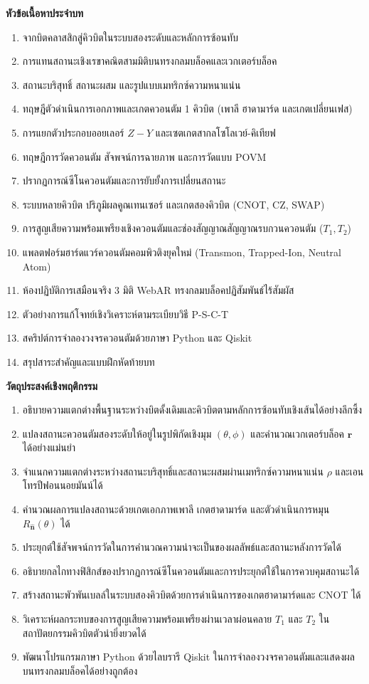 \begin{lessonplanbox}
\noindent\textbf{หัวข้อเนื้อหาประจำบท}
\begin{enumerate}
    \item จากบิตคลาสสิกสู่คิวบิตในระบบสองระดับและหลักการซ้อนทับ
    \item การแทนสถานะเชิงเรขาคณิตสามมิติบนทรงกลมบล็อคและเวกเตอร์บล็อค
    \item สถานะบริสุทธิ์ สถานะผสม และรูปแบบเมทริกซ์ความหนาแน่น
    \item ทฤษฎีตัวดำเนินการเอกภาพและเกตควอนตัม 1 คิวบิต (เพาลี ฮาดามาร์ด และเกตเปลี่ยนเฟส)
    \item การแยกตัวประกอบออยเลอร์ $Z-Y$ และเซตเกตสากลโซโลเวย์-คิเทียฟ
    \item ทฤษฎีการวัดควอนตัม สัจพจน์การฉายภาพ และการวัดแบบ POVM
    \item ปรากฏการณ์ซีโนควอนตัมและการยับยั้งการเปลี่ยนสถานะ
    \item ระบบหลายคิวบิต ปริภูมิผลคูณเทนเซอร์ และเกตสองคิวบิต (CNOT, CZ, SWAP)
    \item การสูญเสียความพร้อมเพรียงเชิงควอนตัมและช่องสัญญาณสัญญาณรบกวนควอนตัม ($T_1, T_2$)
    \item แพลตฟอร์มฮาร์ดแวร์ควอนตัมคอมพิวติงยุคใหม่ (Transmon, Trapped-Ion, Neutral Atom)
    \item ห้องปฏิบัติการเสมือนจริง 3 มิติ WebAR ทรงกลมบล็อคปฏิสัมพันธ์ไร้สัมผัส
    \item ตัวอย่างการแก้โจทย์เชิงวิเคราะห์ตามระเบียบวิธี P-S-C-T
    \item สคริปต์การจำลองวงจรควอนตัมด้วยภาษา Python และ Qiskit
    \item สรุปสาระสำคัญและแบบฝึกหัดท้ายบท
\end{enumerate}

\noindent\textbf{วัตถุประสงค์เชิงพฤติกรรม}
\begin{enumerate}
    \item อธิบายความแตกต่างพื้นฐานระหว่างบิตดั้งเดิมและคิวบิตตามหลักการซ้อนทับเชิงเส้นได้อย่างลึกซึ้ง
    \item แปลงสถานะควอนตัมสองระดับให้อยู่ในรูปพิกัดเชิงมุม $(\theta, \phi)$ และคำนวณเวกเตอร์บล็อค $\mathbf{r}$ ได้อย่างแม่นยำ
    \item จำแนกความแตกต่างระหว่างสถานะบริสุทธิ์และสถานะผสมผ่านเมทริกซ์ความหนาแน่น $\rho$ และเอนโทรปีฟอนนอยมันน์ได้
    \item คำนวณผลการแปลงสถานะด้วยเกตเอกภาพเพาลี เกตฮาดามาร์ด และตัวดำเนินการหมุน $R_{\hat{\mathbf{n}}}(\theta)$ ได้
    \item ประยุกต์ใช้สัจพจน์การวัดในการคำนวณความน่าจะเป็นของผลลัพธ์และสถานะหลังการวัดได้
    \item อธิบายกลไกทางฟิสิกส์ของปรากฏการณ์ซีโนควอนตัมและการประยุกต์ใช้ในการควบคุมสถานะได้
    \item สร้างสถานะพัวพันเบลล์ในระบบสองคิวบิตด้วยการดำเนินการของเกตฮาดามาร์ดและ CNOT ได้
    \item วิเคราะห์ผลกระทบของการสูญเสียความพร้อมเพรียงผ่านเวลาผ่อนคลาย $T_1$ และ $T_2$ ในสถาปัตยกรรมคิวบิตตัวนำยิ่งยวดได้
    \item พัฒนาโปรแกรมภาษา Python ด้วยไลบรารี Qiskit ในการจำลองวงจรควอนตัมและแสดงผลบนทรงกลมบล็อคได้อย่างถูกต้อง
\end{enumerate}
\end{lessonplanbox}

